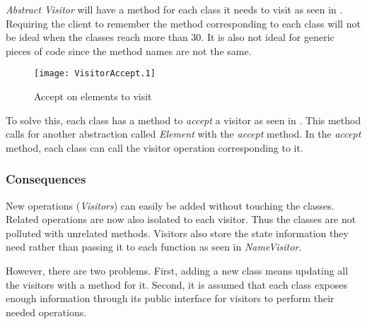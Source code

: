\textit{Abstract Visitor} will have a method for each class it needs to visit as seen in .
Requiring the client to remember the method corresponding to each class will not be ideal when the classes reach more than 30.
It is also not ideal for generic pieces of code since the method names are not the same.

\begin{figure}[h]
	\centering
	\texttt{[image: VisitorAccept.1]}
	\caption{Accept on elements to visit}
	\label{fig:VisitorAccept}
\end{figure}

To solve this, each class has a method to \textit{accept} a visitor as seen in .
This method calls for another abstraction called \textit{Element} with the \textit{accept} method.
In the \textit{accept} method, each class can call the visitor operation corresponding to it.

\subsubsection{Consequences}
New operations (\textit{Visitors}) can easily be added without touching the classes.
Related operations are now also isolated to each visitor.
Thus the classes are not polluted with unrelated methods.
Visitors also store the state information they need rather than passing it to each function as seen in \textit{NameVisitor}.

However, there are two problems.
First, adding a new class means updating all the visitors with a method for it.
Second, it is assumed that each class exposes enough information through its public interface for visitors to perform their needed operations.